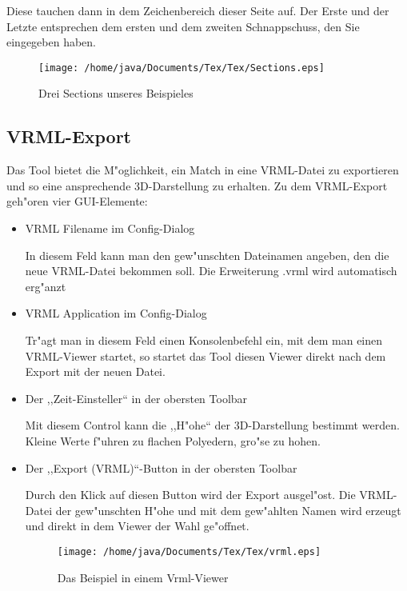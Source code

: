Diese tauchen dann in dem Zeichenbereich dieser Seite auf. Der Erste und der Letzte entsprechen dem ersten und dem zweiten Schnappschuss, den Sie eingegeben haben.
\begin{figure}
   \centering
   \texttt{[image: /home/java/Documents/Tex/Tex/Sections.eps]}
   \caption{Drei Sections unseres Beispieles}
   \label{fig:Sections}
\end{figure}
\subsection{VRML-Export}
Das Tool bietet die M"oglichkeit, ein Match in eine VRML-Datei zu exportieren und so eine ansprechende 3D-Darstellung zu erhalten. Zu dem VRML-Export geh"oren vier GUI-Elemente:
\begin{itemize}
\item VRML Filename im Config-Dialog

 In diesem Feld kann man den gew"unschten Dateinamen angeben, den die neue VRML-Datei bekommen soll. Die Erweiterung .vrml wird automatisch erg"anzt
\item VRML Application im Config-Dialog

Tr"agt man in diesem Feld einen Konsolenbefehl ein, mit dem man einen VRML-Viewer startet, so startet das Tool diesen Viewer direkt nach dem Export mit der neuen Datei.

\item Der ,,Zeit-Einsteller`` in der obersten Toolbar

Mit diesem Control kann die ,,H"ohe`` der 3D-Darstellung bestimmt werden. Kleine Werte f"uhren zu flachen Polyedern, gro"se zu hohen.
\item Der ,,Export (VRML)``-Button in der obersten Toolbar

Durch den Klick auf diesen Button wird der Export ausgel"ost. Die VRML-Datei der gew"unschten H"ohe und mit dem gew"ahlten Namen wird erzeugt und direkt in dem Viewer der Wahl ge"offnet.
\begin{figure}
   \centering
   \texttt{[image: /home/java/Documents/Tex/Tex/vrml.eps]}
   \caption{Das Beispiel in einem Vrml-Viewer}
   \label{fig:vrml}
\end{figure}
\end{itemize}
